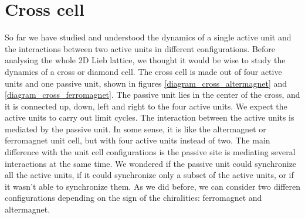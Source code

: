 \documentclass[11pt, a4paper]{article} %
\begin{document}



\section{Cross cell}
\label{section:cross}

So far we have studied and understood the dynamics of a single active unit and the interactions between two active units in different configurations.
Before analysing the whole 2D Lieb lattice, we thought it would be wise to study the dynamics of a cross or diamond cell. 
The cross cell is made out of four active units and one passive unit, shown in figures \ref{diagram_cross_altermagnet}
and \ref{diagram_cross_ferromagnet}. The passive unit lies in the center of the cross, and 
it is connected up, down, left and right to the four active units. We expect the active units to carry out limit cycles. 
The interaction between the active units is mediated by the passive unit. In some sense, it is like the altermagnet or ferromagnet unit 
cell, but with four active units instead of two. The main difference with the unit cell configurations is the passive site is mediating 
several interactions at the same time. We wondered if the passive unit could synchronize all the active units, if it could synchronize 
only a subset of the active units, or if it wasn't able to synchronize them. 
As we did before, we can consider two differen configurations depending on the sign of the chiralities: ferromagnet and altermagnet. 
\end{document}
